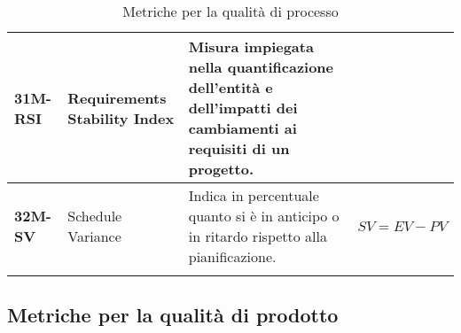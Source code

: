 \begin{longtable}{|>{\centering\arraybackslash}p{}|>{\centering\arraybackslash}p{}|>{\centering\arraybackslash}p{}|>{\centering\arraybackslash}p{}|}
	\hline
	\textbf{31M-RSI}  & Requirements Stability Index & Misura impiegata nella quantificazione dell'entità e dell'impatti dei cambiamenti ai requisiti di un progetto.                 &                                                                                                               \\
	\hline
	\textbf{32M-SV}   & Schedule Variance            & Indica in percentuale quanto si è in anticipo o in ritardo rispetto alla pianificazione.                                       & $SV = EV - PV$                                                                                                \\
	\hline
	\caption{Metriche per la qualità di processo}
	\label{table:3}
\end{longtable}

\subsection{Metriche per la qualità di prodotto}
